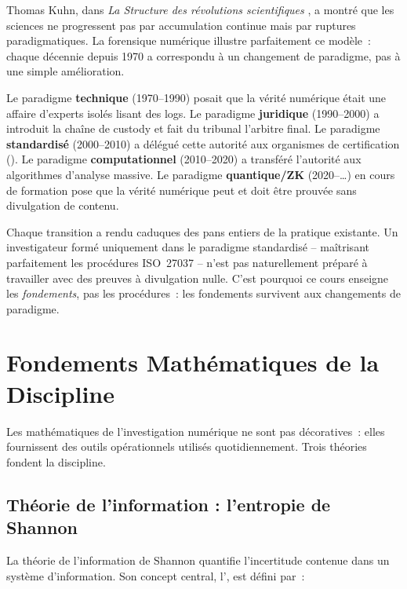 Thomas Kuhn, dans \textit{La Structure des révolutions scientifiques}
\cite{kuhn1962}, a montré que les sciences ne progressent pas par accumulation
continue mais par ruptures paradigmatiques. La forensique numérique illustre
parfaitement ce modèle~: chaque décennie depuis 1970 a correspondu à un
changement de paradigme, pas à une simple amélioration.

\medskip

Le paradigme \textbf{technique} (1970--1990) posait que la vérité numérique
était une affaire d'experts isolés lisant des logs. Le paradigme
\textbf{juridique} (1990--2000) a introduit la chaîne de custody et fait
du tribunal l'arbitre final. Le paradigme \textbf{standardisé} (2000--2010)
a délégué cette autorité aux organismes de certification ().
Le paradigme \textbf{computationnel} (2010--2020) a transféré l'autorité
aux algorithmes d'analyse massive. Le paradigme \textbf{quantique/ZK}
(2020--\ldots) en cours de formation pose que la vérité numérique peut et
doit être prouvée sans divulgation de contenu.

\medskip

Chaque transition a rendu caduques des pans entiers de la pratique
existante. Un investigateur formé uniquement dans le paradigme standardisé
-- maîtrisant parfaitement les procédures ISO~27037 -- n'est pas
naturellement préparé à travailler avec des preuves à divulgation nulle.
C'est pourquoi ce cours enseigne les \emph{fondements}, pas les procédures~:
les fondements survivent aux changements de paradigme.

\section{Fondements Mathématiques de la Discipline}

Les mathématiques de l'investigation numérique ne sont pas décoratives~:
elles fournissent des outils opérationnels utilisés quotidiennement.
Trois théories fondent la discipline.

\subsection{Théorie de l'information : l'entropie de Shannon}
\label{subsec:shannon}

La théorie de l'information de Shannon \cite{shannon1948} quantifie
l'incertitude contenue dans un système d'information. Son concept central,
l', est
défini par~:

